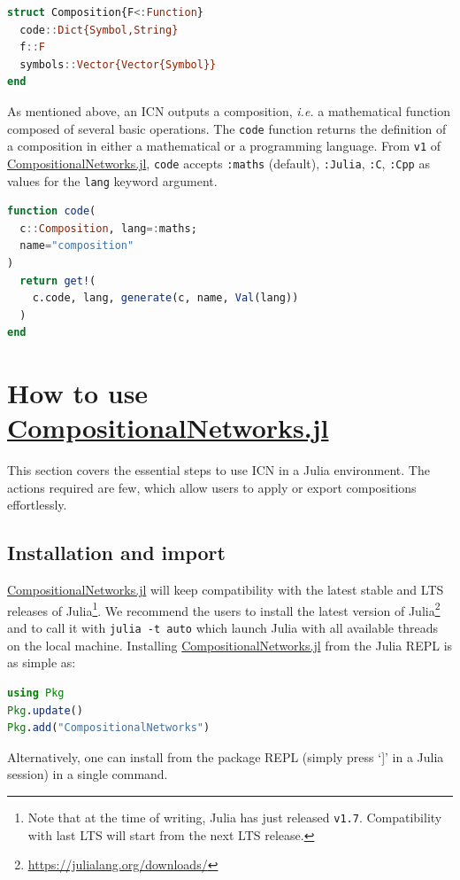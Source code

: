 \documentclass{juliacon}
\newcommand{\ie}{\emph{i.e.}}
\newcommand{\cnjl}{\href{https://github.com/JuliaConstraints/CompositionalNetworks.jl}{CompositionalNetworks.jl}\xspace}
\begin{document}
\begin{lstlisting}[language = Julia]
struct Composition{F<:Function}
  code::Dict{Symbol,String}
  f::F
  symbols::Vector{Vector{Symbol}}
end
\end{lstlisting}

As mentioned above, an ICN outputs a composition, \ie{} a mathematical function composed of several basic operations. The \texttt{code} function returns the definition of a composition in either a mathematical or a programming language. From \texttt{v1} of \cnjl, \texttt{code} accepts \texttt{:maths} (default), \texttt{:Julia}, \texttt{:C}, \texttt{:Cpp} as values for the \texttt{lang} keyword argument.

\begin{lstlisting}[language = Julia]
function code(
  c::Composition, lang=:maths;
  name="composition"
)
  return get!(
    c.code, lang, generate(c, name, Val(lang))
  )
end
\end{lstlisting}

\section{How to use \cnjl}
\label{sec:use}

This section covers the essential steps to use ICN in a Julia environment. The actions required are few, which allow users to apply or export compositions effortlessly.

\subsection{Installation and import}
\label{subsec:install}

\cnjl will keep compatibility with the latest stable and LTS releases of Julia\footnote{Note that at the time of writing, Julia has just released \texttt{v1.7}. Compatibility with last LTS will start from the next LTS release.}. We recommend the users to install the latest version of Julia\footnote{\url{https://julialang.org/downloads/}} and to call it with \texttt{julia -t auto} which launch Julia with all available threads on the local machine. Installing \cnjl from the Julia REPL is as simple as:

\begin{lstlisting}[language = Julia]
using Pkg
Pkg.update()
Pkg.add("CompositionalNetworks")
\end{lstlisting}

Alternatively, one can install from the package REPL (simply press `]' in a Julia session) in a single command.
\end{document}
